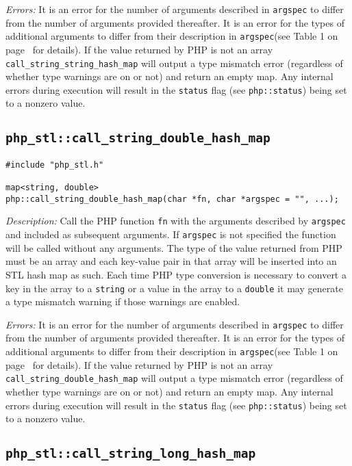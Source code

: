 \documentclass[11pt,titlepage]{article}
\begin{document}
\emph{Errors:} It is an error for the number of arguments described in \verb|argspec| to differ from the number of arguments provided thereafter. It is an error for the types of additional arguments to differ from their description in \verb|argspec|(see Table 1 on page~\pageref{Table1} for details). If the value returned by PHP is not an array \verb|call_string_string_hash_map| will output a type mismatch error (regardless of whether type warnings are on or not) and return an empty map. Any internal errors during execution will result in the \verb|status| flag (see \verb|php::status|) being set to a nonzero value.


\subsection{\texttt{php\_stl::call\_string\_double\_hash\_map}}

\begin{verbatim}
#include "php_stl.h"

map<string, double> 
php::call_string_double_hash_map(char *fn, char *argspec = "", ...);
\end{verbatim}

\emph{Description:} Call the PHP function \verb|fn| with the arguments described by \verb|argspec| and included as subsequent arguments. If \verb|argspec| is not specified the function will be called without any arguments. The type of the value returned from PHP must be an array and each key-value pair in that array will be inserted into an STL hash map as such. Each time PHP type conversion is necessary to convert a key in the array to a \verb|string| or a value in the array to a \verb|double| it may generate a type mismatch warning if those warnings are enabled.

\emph{Errors:} It is an error for the number of arguments described in \verb|argspec| to differ from the number of arguments provided thereafter. It is an error for the types of additional arguments to differ from their description in \verb|argspec|(see Table 1 on page~\pageref{Table1} for details). If the value returned by PHP is not an array \verb|call_string_double_hash_map| will output a type mismatch error (regardless of whether type warnings are on or not) and return an empty map. Any internal errors during execution will result in the \verb|status| flag (see \verb|php::status|) being set to a nonzero value.


\subsection{\texttt{php\_stl::call\_string\_long\_hash\_map}}
\end{document}
